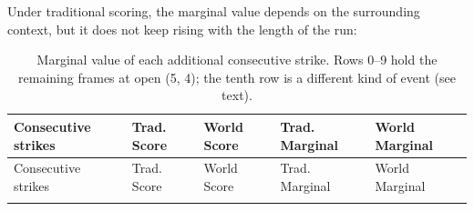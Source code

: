 \documentclass[
  letterpaper,
  DIV=11,
  numbers=noendperiod]{scrartcl}
\begin{document}
Under traditional scoring, the marginal value depends on the surrounding
context, but it does not keep rising with the length of the run:

\begin{longtable}[]{@{}
  >{\raggedright\arraybackslash}p{}
  >{\raggedright\arraybackslash}p{}
  >{\raggedright\arraybackslash}p{}
  >{\raggedright\arraybackslash}p{}
  >{\raggedright\arraybackslash}p{}@{}}
\caption{Marginal value of each additional consecutive strike. Rows 0--9
hold the remaining frames at open (5, 4); the tenth row is a different
kind of event (see text).}\label{tbl-gradient}\tabularnewline
\toprule\noalign{}
\begin{minipage}[b]{\linewidth}\raggedright
Consecutive strikes
\end{minipage} & \begin{minipage}[b]{\linewidth}\raggedright
Trad. Score
\end{minipage} & \begin{minipage}[b]{\linewidth}\raggedright
World Score
\end{minipage} & \begin{minipage}[b]{\linewidth}\raggedright
Trad. Marginal
\end{minipage} & \begin{minipage}[b]{\linewidth}\raggedright
World Marginal
\end{minipage} \\
\midrule\noalign{}
\endfirsthead
\toprule\noalign{}
\begin{minipage}[b]{\linewidth}\raggedright
Consecutive strikes
\end{minipage} & \begin{minipage}[b]{\linewidth}\raggedright
Trad. Score
\end{minipage} & \begin{minipage}[b]{\linewidth}\raggedright
World Score
\end{minipage} & \begin{minipage}[b]{\linewidth}\raggedright
Trad. Marginal
\end{minipage} & \begin{minipage}[b]{\linewidth}\raggedright
World Marginal
\end{minipage} \\
\midrule\noalign{}
\endhead
\bottomrule\noalign{}

\end{longtable}
\end{document}

